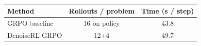 \begin{minipage}{\TableWidth}
\centering
\small
\begin{tabular*}{\linewidth}{@{\extracolsep{\fill}}lcc@{}}
\toprule
Method & Rollouts / problem & Time (s / step) \\
\midrule
GRPO baseline & 16 on-policy & 43.8 \\
DenoiseRL-GRPO & 12+4 & 49.7 \\
\bottomrule
\end{tabular*}
\end{minipage}
